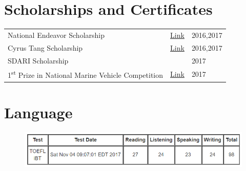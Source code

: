 \documentclass[a4paper,10pt]{article}
\begin{document}
\section{Scholarships and Certificates}
\begin{tabular}{lcl}
National Endeavor Scholarship & \href{http://www.moe.gov.cn/jyb_xwfb/xw_zt/moe_357/jyzt_2015nztzl/2015_zt06/15zt06_gxzzzc/gxzz_bzks/201508/t20150810_199203.html}{Link}& 2016,2017\\
Cyrus Tang Scholarship & \href{http://www.tangfoundation.org/index.php?option=com_content&view=article&id=12&Itemid=89&site=CTF&sub=0}{Link}& 2016,2017 \\ 
SDARI Scholarship &  & 2017 \\
1\textsuperscript{st} Prize in National Marine Vehicle Competition & \href{http://www.csname.org.cn/qghyhxqds/325112.htm}{Link} & 2017
\end{tabular}

\section{Language}
\begin{figure}[H]
    \centering
    \includegraphics{TOEFL.PNG}
\end{figure}
\end{document}
